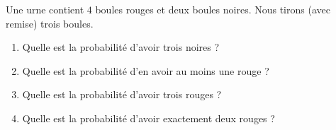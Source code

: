 
\begin{exercice}\label{exoPremiere-0090}

    Une urne contient \( 4\) boules rouges et deux boules noires. Nous tirons (avec remise) trois boules.
    \begin{enumerate}
        \item
            Quelle est la probabilité d'avoir trois noires ?
        \item
            Quelle est la probabilité d'en avoir au moins une rouge ?
        \item
            Quelle est la probabilité d'avoir trois rouges ?
        \item 
            Quelle est la probabilité d'avoir exactement deux rouges ?
    \end{enumerate}

\end{exercice}
